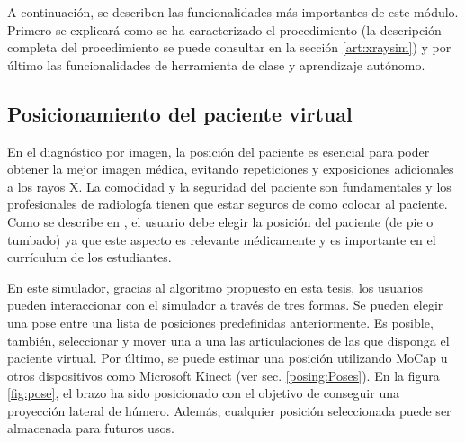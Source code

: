 A continuación, se describen las funcionalidades más importantes de este módulo. Primero se explicará como se ha caracterizado el procedimiento (la descripción  completa del procedimiento se puede consultar en la sección \ref{art:xraysim}) y por último las funcionalidades de herramienta de clase y aprendizaje autónomo.




\subsection{Posicionamiento del paciente virtual}
\label{xray:posing}

En el diagnóstico por imagen, la posición del paciente es esencial para poder obtener la mejor imagen médica, evitando repeticiones y exposiciones adicionales a los rayos X. La comodidad y la seguridad del paciente son fundamentales y los profesionales de radiología tienen que estar seguros de como colocar al paciente. Como se describe en \cite{carver2012medical,manualpractico}, el usuario debe elegir la posición del paciente (de pie o tumbado) ya que este aspecto es relevante médicamente y es importante en el currículum de los estudiantes.

En este simulador, gracias al algoritmo propuesto en esta tesis, %
los usuarios pueden interaccionar con el simulador a través %
de tres formas. Se pueden elegir una pose entre una lista de posiciones predefinidas anteriormente. Es posible, también, seleccionar y mover una a una las articulaciones de las que disponga el paciente virtual. Por último, se puede estimar una posición utilizando \ac{MoCap} u otros dispositivos como Microsoft Kinect (ver sec. \ref{posing:Poses}). 
%
En la figura \ref{fig:pose}, el brazo ha sido posicionado con el objetivo de conseguir una proyección lateral de húmero. Además, cualquier posición seleccionada puede ser almacenada para futuros usos.



		
